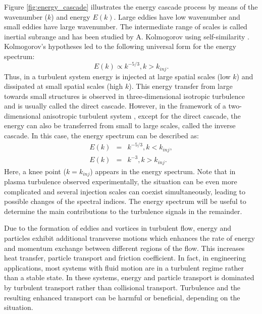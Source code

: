 Figure \ref{fig:energy_cascade} illustrates the energy cascade process by means of the wavenumber ($k$) and energy $E(k)$. Large eddies have low wavenumber and small eddies have large wavenumber. The intermediate range of scales is called inertial subrange and has been studied by A. Kolmogorov using self-similarity \cite{Kolmogorov_1941_MPS}. Kolmogorov's hypotheses led to the following universal form for the energy spectrum:%
\begin{equation}\label{eq:energy_cascade}
  E(k) \propto k^{-5/3}, k > k_{inj}.
\end{equation}
\noindent Thus, in a turbulent system energy is injected at large spatial scales (low $k$) and dissipated at small spatial scales (high $k$). This energy transfer from large towards small structures is observed in three-dimensional isotropic turbulence and is usually called the direct cascade. However, in the framework of a two-dimensional anisotropic turbulent system \cite{Kraichnan_1971_JFM}, except for the direct cascade, the energy can also be transferred from small to large scales, called the inverse cascade. In this case, the energy spectrum can be described as:%
\begin{eqnarray}
  E(k) &=& k^{-5/3}, k < k_{inj}, \\
  E(k) &=& k^{-3}, k > k_{inj}.
\end{eqnarray}
\noindent Here, a knee point ($k=k_{inj}$) appears in the energy spectrum. Note that in plasma turbulence observed experimentally, the situation can be even more complicated and several injection scales can coexist simultaneously, leading to possible changes of the spectral indices. The energy spectrum will be useful to determine the main contributions to the turbulence signals in the remainder.

Due to the formation of eddies and vortices in turbulent flow, energy and particles exhibit additional transverse motions which enhances the rate of energy and momentum exchange between different regions of the flow. This increases heat transfer, particle transport and friction coefficient. In fact, in engineering applications, most systems with fluid motion are in a turbulent regime rather than a stable state. In these systems, energy and particle transport is dominated by turbulent transport rather than collisional transport. Turbulence and the resulting enhanced transport can be harmful or beneficial, depending on the situation.


